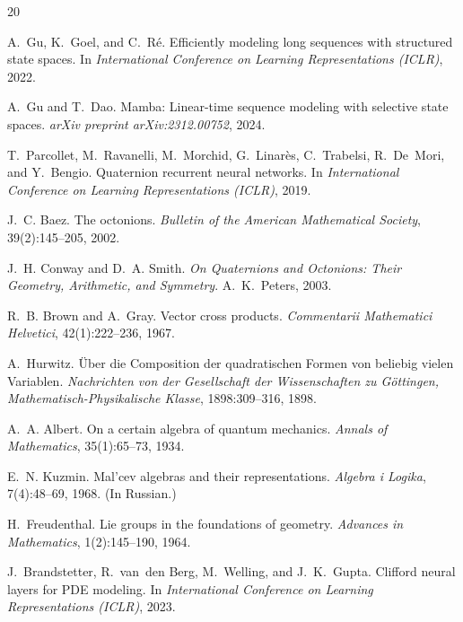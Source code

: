 \documentclass{article}
\begin{document}
\begin{thebibliography}{20}

A.~Gu, K.~Goel, and C.~R\'{e}.
\newblock Efficiently modeling long sequences with structured state spaces.
\newblock In \emph{International Conference on Learning Representations (ICLR)}, 2022.

A.~Gu and T.~Dao.
\newblock Mamba: Linear-time sequence modeling with selective state spaces.
\newblock \emph{arXiv preprint arXiv:2312.00752}, 2024.

T.~Parcollet, M.~Ravanelli, M.~Morchid, G.~Linar\`{e}s, C.~Trabelsi, R.~De~Mori, and Y.~Bengio.
\newblock Quaternion recurrent neural networks.
\newblock In \emph{International Conference on Learning Representations (ICLR)}, 2019.

J.~C. Baez.
\newblock The octonions.
\newblock \emph{Bulletin of the American Mathematical Society}, 39(2):145--205, 2002.

J.~H. Conway and D.~A. Smith.
\newblock \emph{On Quaternions and Octonions: Their Geometry, Arithmetic, and Symmetry}.
\newblock A.~K.~Peters, 2003.

R.~B. Brown and A.~Gray.
\newblock Vector cross products.
\newblock \emph{Commentarii Mathematici Helvetici}, 42(1):222--236, 1967.

A.~Hurwitz.
\newblock \"{U}ber die Composition der quadratischen Formen von beliebig vielen Variablen.
\newblock \emph{Nachrichten von der Gesellschaft der Wissenschaften zu G\"{o}ttingen, Mathematisch-Physikalische Klasse}, 1898:309--316, 1898.

A.~A. Albert.
\newblock On a certain algebra of quantum mechanics.
\newblock \emph{Annals of Mathematics}, 35(1):65--73, 1934.

E.~N. Kuzmin.
\newblock Mal'cev algebras and their representations.
\newblock \emph{Algebra i Logika}, 7(4):48--69, 1968.
\newblock (In Russian.)

H.~Freudenthal.
\newblock Lie groups in the foundations of geometry.
\newblock \emph{Advances in Mathematics}, 1(2):145--190, 1964.

J.~Brandstetter, R.~van~den Berg, M.~Welling, and J.~K.~Gupta.
\newblock Clifford neural layers for PDE modeling.
\newblock In \emph{International Conference on Learning Representations (ICLR)}, 2023.

\end{thebibliography}
\end{document}
